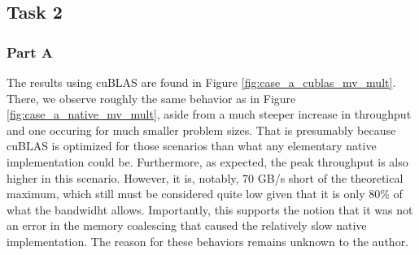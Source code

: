 \documentclass[9pt]{article}
\begin{document}
\subsection{Task 2}
\subsubsection{Part A}
The results using cuBLAS are found in Figure \ref{fig:case_a_cublas_mv_mult}. There, we observe roughly the same behavior as in Figure \ref{fig:case_a_native_mv_mult}, aside from a much steeper increase in throughput and one occuring for much smaller problem sizes. That is presumably because cuBLAS is optimized for those scenarios than what any elementary native implementation could be. Furthermore, as expected, the peak throughput is also higher in this scenario. However, it is, notably, 70 GB/s short of the theoretical maximum, which still must be considered quite low given that it is only 80\% of what the bandwidht allows. Importantly, this supports the notion that it was not an error in the memory coalescing that caused the relatively slow native implementation. The reason for these behaviors remains unknown to the author. 
\end{document}
